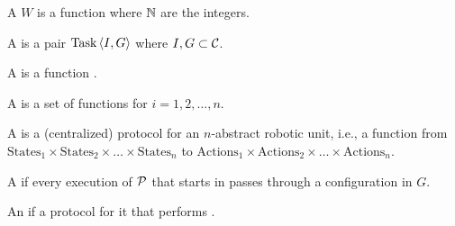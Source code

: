 \begin{defi}
A  $W$ is a function  where $\mathbb{N}$ are the integers.
\cite{conf/ijcai/BrafmanS95}
\end{defi}

\begin{defi}[Task]
A  is a pair $\mbox{Task}\left\langle I,G\right\rangle$ where $I,G\subset\mathcal{C}$.
\cite{conf/ijcai/BrafmanS95}
\end{defi}

\begin{defi}
A  is a function .
\cite{conf/ijcai/BrafmanS95}
\end{defi}

\begin{defi}
A  is a set of functions  for $i=1,2,\ldots,n$.
\cite{conf/ijcai/BrafmanS95}
\end{defi}

\begin{defi}
A  is a (centralized) protocol for an $n$-abstract robotic unit, i.e., a function from $\mbox{States}_1\times\mbox{States}_2\times\ldots\times\mbox{States}_n$ to $\mbox{Actions}_1\times\mbox{Actions}_2\times\ldots\times\mbox{Actions}_n$.
\cite{conf/ijcai/BrafmanS95}
\end{defi}

\begin{defi}
A  if every execution of $\mathcal{P}$ that starts in  passes through a configuration in $G$.
\cite{conf/ijcai/BrafmanS95}
\end{defi}

\begin{defi}
An  if \tiTx{} a protocol for it that performs .
\cite{conf/ijcai/BrafmanS95}
\end{defi}

